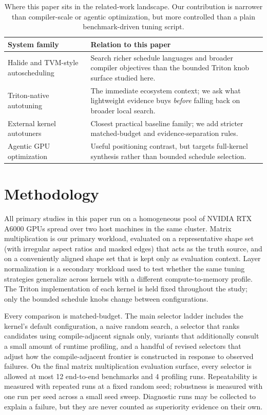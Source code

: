 \documentclass[10pt,twocolumn]{article}
\begin{document}
\begin{table}[t]
\centering
\small
\begin{tabular}{p{}p{}}
\toprule
System family & Relation to this paper \\
\midrule
Halide and TVM-style autoscheduling & Search richer schedule languages and broader compiler objectives than the bounded Triton knob surface studied here. \\
Triton-native autotuning & The immediate ecosystem context; we ask what lightweight evidence buys \emph{before} falling back on broader local search. \\
External kernel autotuners & Closest practical baseline family; we add stricter matched-budget and evidence-separation rules. \\
Agentic GPU optimization & Useful positioning contrast, but targets full-kernel synthesis rather than bounded schedule selection. \\
\bottomrule
\end{tabular}
\caption{Where this paper sits in the related-work landscape. Our contribution is narrower than compiler-scale or agentic optimization, but more controlled than a plain benchmark-driven tuning script.}
\label{tab:condensed-positioning}
\end{table}

\section{Methodology}

All primary studies in this paper run on a homogeneous pool of NVIDIA RTX A6000 GPUs spread over two host machines in the same cluster. Matrix multiplication is our primary workload, evaluated on a representative shape set (with irregular aspect ratios and masked edges) that acts as the truth source, and on a conveniently aligned shape set that is kept only as evaluation context. Layer normalization is a secondary workload used to test whether the same tuning strategies generalize across kernels with a different compute-to-memory profile. The Triton implementation of each kernel is held fixed throughout the study; only the bounded schedule knobs change between configurations.

Every comparison is matched-budget. The main selector ladder includes the kernel's default configuration, a naive random search, a selector that ranks candidates using compile-adjacent signals only, variants that additionally consult a small amount of runtime profiling, and a handful of revised selectors that adjust how the compile-adjacent frontier is constructed in response to observed failures. On the final matrix multiplication evaluation surface, every selector is allowed at most 12 end-to-end benchmarks and 4 profiling runs. Repeatability is measured with repeated runs at a fixed random seed; robustness is measured with one run per seed across a small seed sweep. Diagnostic runs may be collected to explain a failure, but they are never counted as superiority evidence on their own.
\end{document}
